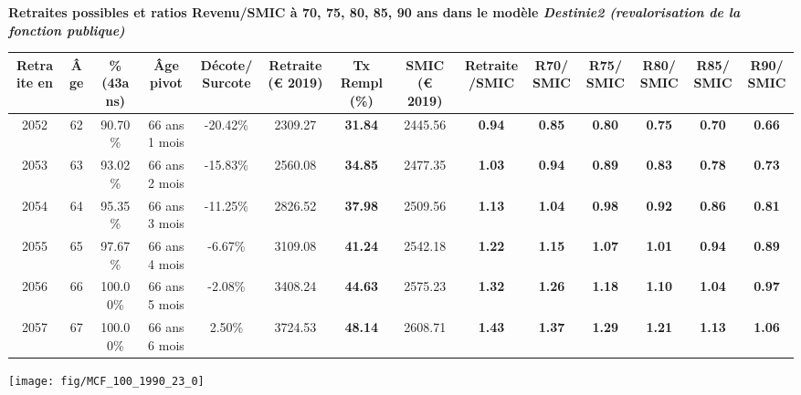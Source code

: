  \vspace{0.1cm} 
{\bf \noindent Retraites possibles et ratios Revenu/SMIC à 70, 75, 80, 85, 90 ans dans le modèle \emph{Destinie2 (revalorisation de la fonction publique)}}  
 
\begin{adjustbox}{max width=\textwidth} 
\begin{tabular}[htb]{|c|c||c|c|c||c|c||c|c||c|c|c|c|c|} 
\hline 
 Retraite en &  Âge &  \%(43ans) &  Âge pivot &  Décote/Surcote &  Retraite (\euro{} 2019) &  Tx Rempl(\%) &  SMIC (\euro{} 2019) &  Retraite/SMIC &  R70/SMIC &  R75/SMIC &  R80/SMIC &  R85/SMIC &  R90/SMIC \\ 
\hline \hline 
 2052 &  62 &  90.70\% &  66 ans 1 mois &  -20.42\% &  2309.27 &  {\bf 31.84} &  2445.56 &  {\bf {\color{red} 0.94}} &  {\bf {\color{red} 0.85}} &  {\bf {\color{red} 0.80}} &  {\bf {\color{red} 0.75}} &  {\bf {\color{red} 0.70}} &  {\bf {\color{red} 0.66}} \\ 
\hline 
 2053 &  63 &  93.02\% &  66 ans 2 mois &  -15.83\% &  2560.08 &  {\bf 34.85} &  2477.35 &  {\bf 1.03} &  {\bf {\color{red} 0.94}} &  {\bf {\color{red} 0.89}} &  {\bf {\color{red} 0.83}} &  {\bf {\color{red} 0.78}} &  {\bf {\color{red} 0.73}} \\ 
\hline 
 2054 &  64 &  95.35\% &  66 ans 3 mois &  -11.25\% &  2826.52 &  {\bf 37.98} &  2509.56 &  {\bf 1.13} &  {\bf 1.04} &  {\bf {\color{red} 0.98}} &  {\bf {\color{red} 0.92}} &  {\bf {\color{red} 0.86}} &  {\bf {\color{red} 0.81}} \\ 
\hline 
 2055 &  65 &  97.67\% &  66 ans 4 mois &  -6.67\% &  3109.08 &  {\bf 41.24} &  2542.18 &  {\bf 1.22} &  {\bf 1.15} &  {\bf 1.07} &  {\bf 1.01} &  {\bf {\color{red} 0.94}} &  {\bf {\color{red} 0.89}} \\ 
\hline 
 2056 &  66 &  100.00\% &  66 ans 5 mois &  -2.08\% &  3408.24 &  {\bf 44.63} &  2575.23 &  {\bf 1.32} &  {\bf 1.26} &  {\bf 1.18} &  {\bf 1.10} &  {\bf 1.04} &  {\bf {\color{red} 0.97}} \\ 
\hline 
 2057 &  67 &  100.00\% &  66 ans 6 mois &  2.50\% &  3724.53 &  {\bf 48.14} &  2608.71 &  {\bf 1.43} &  {\bf 1.37} &  {\bf 1.29} &  {\bf 1.21} &  {\bf 1.13} &  {\bf 1.06} \\ 
\hline 
\hline 
\end{tabular} 
\end{adjustbox} 
 
 \vspace{0.1cm} 

 {\hspace{-2.2cm}\texttt{[image: fig/MCF\_100\_1990\_23\_0]}} 

